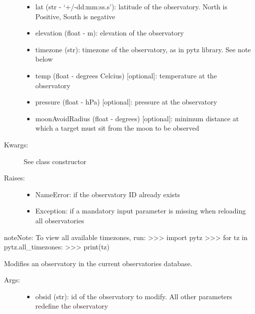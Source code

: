 \documentclass[letterpaper,10pt,english]{sphinxmanual}
\begin{document}
\begin{fulllineitems}
\begin{fulllineitems}
\begin{description}
\begin{itemize}
\item {} 
lat (str - `+/-dd:mm:ss.s'): latitude of the observatory. North is Positive, South is negative

\item {} 
elevation (float - m): elevation of the observatory

\item {} 
timezone (str): timezone of the observatory, as in pytz library. See note below

\item {} 
temp (float - degrees Celcius) {[}optional{]}: temperature at the observatory

\item {} 
pressure (float - hPa) {[}optional{]}: pressure at the observatory

\item {} 
moonAvoidRadius (float - degrees) {[}optional{]}: minimum distance at which a target must sit from the moon to be observed

\end{itemize}

\item[{Kwargs:}] \leavevmode
See class constructor

\item[{Raises:}] \leavevmode\begin{itemize}
\item {} 
NameError: if the observatory ID already exists

\item {} 
Exception: if a mandatory input parameter is missing when reloading all observatories

\end{itemize}

\end{description}

\begin{notice}{note}{Note:}
To view all available timezones, run:
\textgreater{}\textgreater{}\textgreater{} import pytz
\textgreater{}\textgreater{}\textgreater{} for tz in pytz.all\_timezones:
\textgreater{}\textgreater{}\textgreater{}     print(tz)
\end{notice}

\end{fulllineitems}


\begin{fulllineitems}
\label{astroobs:astroobs.ObservatoryList.mod}
Modifies an observatory in the current observatories database.
\begin{description}
\item[{Args:}] \leavevmode\begin{itemize}
\item {} 
obsid (str): id of the observatory to modify. All other parameters redefine the observatory


\end{itemize}
\end{description}
\end{fulllineitems}
\end{fulllineitems}
\end{document}

